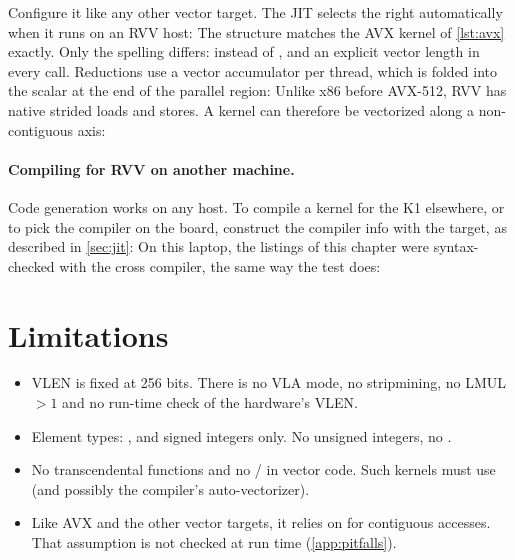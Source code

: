 Configure it like any other vector target. The JIT selects the right 
automatically when it runs on an RVV host:
The structure matches the AVX kernel of \cref{lst:avx} exactly. Only the spelling
differs:  instead of , and an explicit 
vector length in every call. Reductions use a vector accumulator per thread, which is
folded into the scalar at the end of the parallel region:
Unlike x86 before AVX-512, RVV has native strided loads and stores. A kernel can
therefore be vectorized along a non-contiguous axis:

\paragraph{Compiling for RVV on another machine.}
Code generation works on any host. To compile a kernel for the K1 elsewhere, or to pick
the compiler on the board, construct the compiler info with the target, as described in
\cref{sec:jit}:
On this laptop, the listings of this chapter were syntax-checked with the cross
compiler, the same way the test  does:

\section{Limitations}
\begin{itemize}
  \item VLEN is fixed at 256 bits. There is no VLA mode, no stripmining, no LMUL $>1$
        and no run-time check of the hardware's VLEN.
  \item Element types: ,  and signed integers only. No
        unsigned integers, no .
  \item No transcendental functions and no / in vector code. Such
        kernels must use  (and possibly the compiler's
        auto-vectorizer).
  \item Like AVX and the other vector targets, it relies on
         for contiguous accesses. That assumption is not
        checked at run time (\cref{app:pitfalls}).
\end{itemize}

